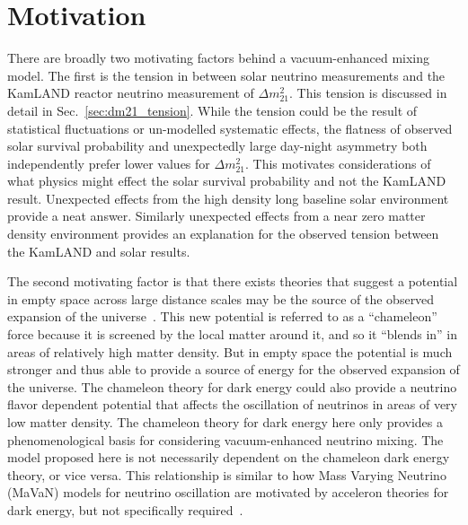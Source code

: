 \section{Motivation}
\label{sec:motivations}
There are broadly two motivating factors behind a  vacuum-enhanced mixing model.
The first is the tension in between solar neutrino measurements and 
the KamLAND reactor neutrino measurement of $\Delta m^{2}_{21}$.
This tension is discussed in detail in Sec.~\ref{sec:dm21_tension}.
While the tension could be the result of statistical fluctuations or un-modelled
systematic effects, the flatness of observed solar survival probability and
unexpectedly large day-night asymmetry both independently prefer lower values
for $\Delta m^{2}_{21}$.
This motivates considerations of what physics might effect the solar survival
probability and not the KamLAND result.
Unexpected effects from the high density long baseline solar environment provide a neat answer.
Similarly unexpected effects from a near zero matter density environment
provides an explanation for the observed tension between the KamLAND and solar
results.

The second motivating factor is that there exists theories that
suggest a potential in empty space across large distance scales may be the source
of the observed expansion of the universe~\citep{khoury_chameleons}.
This new potential is referred to as a ``chameleon'' force because it
is screened by the local matter around it, and so it ``blends in'' in
areas of relatively high matter density.
But in empty space the potential is much stronger and thus able to provide
a source of energy for the observed expansion of the universe.
The chameleon theory for dark energy could also provide a neutrino flavor dependent
potential that affects the oscillation of neutrinos in areas of very low matter
density.
The chameleon theory for dark energy here only provides a phenomenological basis
for considering vacuum-enhanced neutrino mixing. The model proposed here is
not necessarily dependent on the chameleon dark energy theory, or vice versa.
This relationship is similar to how Mass Varying Neutrino (MaVaN) models
for neutrino oscillation are motivated by acceleron theories for dark energy,
but not specifically required~\citep{mavans_cosmology}.


